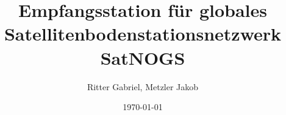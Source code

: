 \documentclass[12pt]{scrreprt}
\title{Empfangsstation für globales Satellitenbodenstationsnetzwerk SatNOGS}
\author{Ritter Gabriel, Metzler Jakob}
\date{\today}
\begin{document}
	
	\maketitle
	
	
	\pagebreak
	
	\tableofcontents
	\pagebreak
	
	
	
	\pagebreak
	
		
	\pagebreak
	
	
	\pagebreak
	
\end{document}
